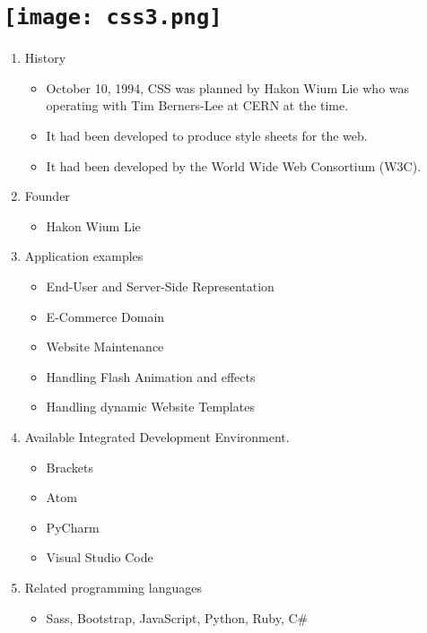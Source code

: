 \section{\texttt{[image: css3.png]}}
\begin{frame}
	
	
	\begin{enumerate}
		\item History
		\begin{itemize}
			\item October 10, 1994, CSS was planned by Hakon Wium Lie who was operating with Tim Berners-Lee at CERN at the time.
			\item It had been developed to produce style sheets for the web.
			\item It had been developed by the World Wide Web Consortium (W3C).
		\end{itemize}
		\item Founder
		\begin{itemize}
			\item Hakon Wium Lie
		\end{itemize}
		\item Application examples
		\begin{itemize}
			\item End-User and Server-Side Representation
			\item E-Commerce Domain
			\item Website Maintenance
			\item Handling Flash Animation and effects
			\item Handling dynamic Website Templates
		\end{itemize}
		\item Available Integrated Development Environment.
		\begin{itemize}
			\item Brackets
			\item Atom
			\item PyCharm
			\item Visual Studio Code
			
		\end{itemize}
		\item Related programming languages
		\begin{itemize}
			\item Sass, Bootstrap, JavaScript, Python, Ruby, C#
		\end{itemize}
	\end{enumerate}
	
\end{frame}

